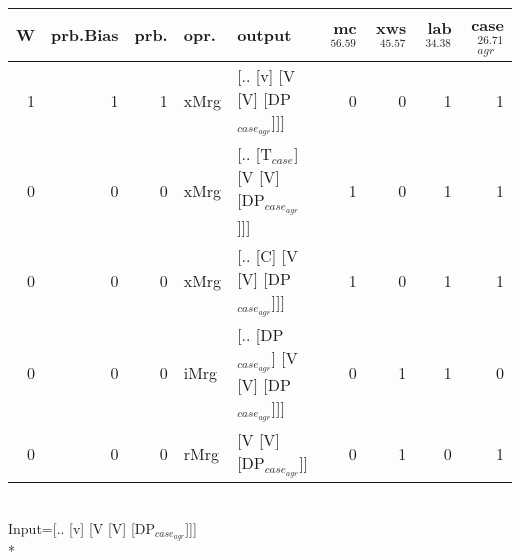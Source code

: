 \begin{tabularx}{\linewidth}{rrrlXrrrr}
\hline
   W &   prb.Bias &   prb. & opr.   & output                                   &   mc$^{56.59}$ &   xws$^{45.57}$ &   lab$^{34.38}$ &   case$_{agr}^{26.71}$ \\
\hline
   1 &       1 &   1 & xMrg & [.. [v] [V [V] [DP$_{case_{agr}}$]]]           &            0 &             0 &             1 &                  1 \\
   0 &       0 &   0 & xMrg & [.. [T$_{case}$] [V [V] [DP$_{case_{agr}}$]]]      &            1 &             0 &             1 &                  1 \\
   0 &       0 &   0 & xMrg & [.. [C] [V [V] [DP$_{case_{agr}}$]]]           &            1 &             0 &             1 &                  1 \\
   0 &       0 &   0 & iMrg & [.. [DP$_{case_{agr}}$] [V [V] [DP$_{case_{agr}}$]]] &            0 &             1 &             1 &                  0 \\
   0 &       0 &   0 & rMrg & [V [V] [DP$_{case_{agr}}$]]                    &            0 &             1 &             0 &                  1 \\
\hline
\end{tabularx}\endgroup\\
\begingroup\scriptsize Input=[.. [v] [V [V] [DP$_{case_{agr}}$]]]\\*
